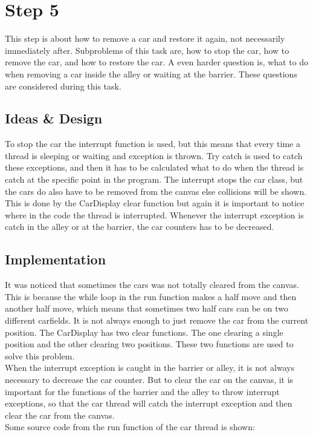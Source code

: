 \section{Step 5}
This step is about how to remove a car and restore it again, not necessarily immediately after. Subproblems of this task are, how to stop the car, how to remove the car, and how to restore the car. A even harder question is, what to do when removing a car inside the alley or waiting at the barrier. These questions are considered during this task.

\subsection{Ideas \& Design}
To stop the car the interrupt function is used, but this means that every time a thread is sleeping or waiting and exception is thrown. Try catch is used to catch these exceptions, and then it has to be calculated what to do when the thread is catch at the specific point in the program. The interrupt stops the car class, but the cars do also have to be removed from the canvas else collisions will be shown. This is done by the CarDisplay clear function but again it is important to notice where in the code the thread is interrupted. Whenever the interrupt exception is catch in the alley or at the barrier, the car counters has to be decreased.

\subsection{Implementation}
It was noticed that sometimes the cars was not totally cleared from the canvas. This is because the while loop in the run function makes a half move and then another half move, which means that sometimes two half cars can be on two different carfields. It is not always enough to just remove the car from the current position. The CarDisplay has two clear functions. The one clearing a single position and the other clearing two positions. These two functions are used to solve this problem.
\\

When the interrupt exception is caught in the barrier or alley, it is not always necessary to decrease the car counter. But to clear the car on the canvas, it is important for the functions of the barrier and the alley to throw interrupt exceptions, so that the car thread will catch the interrupt exception and then clear the car from the canvas. \\
Some source code from the run function of the car thread is shown:

